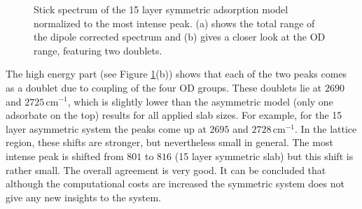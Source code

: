 \documentclass[11pt,DIV=13,BCOR=5mm,a4paper,headinclude]{scrbook}
\begin{document}
 \begin{figure}[!h]
    \centering
             \quad
             \caption{Stick spectrum of the 15 layer symmetric adsorption model normalized to the most intense peak.
(a) shows the total range of the dipole corrected spectrum and (b) gives a closer look at the OD range, featuring two doublets.}
            \label{abb:symm-iCa2_spec}
     \end{figure}
The high energy part (see Figure \ref{abb:symm-iCa2_spec}(b)) shows that each of the two peaks comes as a doublet due to coupling of the four OD groups. %
These doublets lie at $2690$ and $2725\,$cm$^{-1}$, which is slightly lower than the asymmetric model (only one adsorbate on the top) results for all applied slab sizes.
For example, for the 15 layer asymmetric system the peaks come up at $2695$ and $2728\,$cm$^{-1}$.
In the lattice region, these shifts are stronger, but nevertheless small in general.
The most intense peak is shifted from $801$ to $816$ (15 layer symmetric slab) but this shift is rather small.
The overall agreement is very good.
It can be concluded that although the computational costs are increased the symmetric system does not give any new insights to the system.
\\
\def\thefigure{C.\arabic{figure}}
\end{document}
